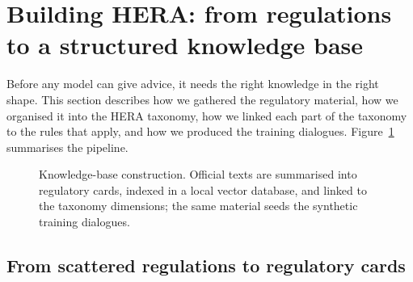 \documentclass[11pt]{article}
\begin{document}
\section{Building HERA: from regulations to a structured knowledge base}
\label{sec:hera}

Before any model can give advice, it needs the right knowledge in the right shape. This
section describes how we gathered the regulatory material, how we organised it into the
HERA taxonomy, how we linked each part of the taxonomy to the rules that apply, and how
we produced the training dialogues. Figure~\ref{fig:pipeline} summarises the pipeline.

\begin{figure}[t]
\centering
{}
\caption{Knowledge-base construction. Official texts are summarised into regulatory
cards, indexed in a local vector database, and linked to the taxonomy dimensions; the
same material seeds the synthetic training dialogues.}
\label{fig:pipeline}
\end{figure}

\subsection{From scattered regulations to regulatory cards}
\end{document}
